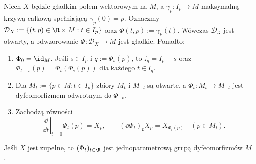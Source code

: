 \begin{twierdzenie}
\label{thm:przeplyw}
Niech $X$ będzie gładkim polem wektorowym na $M$, a
$\gamma_p\colon I_p\to M$ maksymalną krzywą całkową spełniającą
$\gamma_p(0)=p$. Oznaczmy
$\mathcal D_X:=\{(t,p)\in\R\times M:t\in I_p\}$ oraz
$\Phi(t,p):=\gamma_p(t)$.
Wówczas $\mathcal D_X$ jest otwarty, a odwzorowanie
$\Phi\colon\mathcal D_X\to M$ jest gładkie. Ponadto:
\begin{enumerate}
\item $\Phi_0=\id_M$. Jeśli $s\in I_p$ i $q:=\Phi_s(p)$, to
$I_q=I_p-s$ oraz $\Phi_{t+s}(p)=\Phi_t(\Phi_s(p))$
dla każdego $t\in I_q$.
\item Dla $M_t:=\{p\in M:t\in I_p\}$ zbiory $M_t$ i $M_{-t}$
są otwarte, a $\Phi_t\colon M_t\to M_{-t}$ jest dyfeomorfizmem
odwrotnym do $\Phi_{-t}$.
\item Zachodzą równości
\begin{equation}\label{eq:przeplyw-generuje}
\left.\frac{\dd}{\dd t}\right|_{t=0}\Phi_t(p)=X_p,
\qquad (\dd\Phi_t)_pX_p=X_{\Phi_t(p)}
\quad (p\in M_t).
\end{equation}
\end{enumerate}
Jeśli $X$ jest zupełne, to $(\Phi_t)_{t\in\R}$ jest
jednoparametrową grupą dyfeomorfizmów $M$.
\end{twierdzenie}

